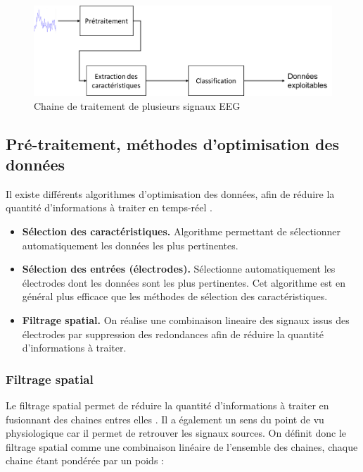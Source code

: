 \begin{figure}[h]
	\centering\includegraphics[width=14cm]{images/traitementEEG2.png}
	\caption{Chaine de traitement de plusieurs signaux EEG}
	\label{traitementEEG2}
\end{figure}

\subsection{Pré-traitement, méthodes d'optimisation des données}
\label{Subsecton : 4.Pré-traitement, méthodes d'optimisation des données}

Il existe différents algorithmes d'optimisation des données, afin de réduire la quantité d'informations à traiter en temps-réel \cite{Lotte}.
\smallbreak
\begin{itemize}
	\item \textbf{Sélection des caractéristiques.} Algorithme permettant de sélectionner automatiquement les données les plus pertinentes. 
	\smallbreak
	\item \textbf{Sélection des entrées (électrodes).} Sélectionne automatiquement les électrodes dont les données sont les plus pertinentes. Cet algorithme est en général plus efficace que les méthodes de sélection des caractéristiques.
	\smallbreak 
	\item \textbf{Filtrage spatial.} On réalise une combinaison lineaire des signaux issus des électrodes par suppression des redondances afin de réduire la quantité d'informations à traiter. 
\end{itemize}

\subsubsection{Filtrage spatial}
\label{Subsubsecton : 4.Filtrage spatial}
Le filtrage spatial permet de réduire la quantité d'informations à traiter en fusionnant des chaines entres elles \cite{Lotte} \cite{Saeid} . Il a également un sens du point de vu physiologique car il permet de retrouver les signaux sources. On définit donc le filtrage spatial comme une combinaison linéaire de l'ensemble des chaines, chaque chaine étant pondérée par un poids : 

